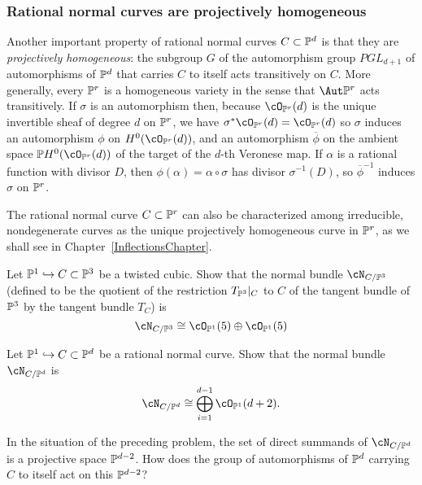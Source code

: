 \subsubsection{Rational normal curves are projectively homogeneous}

Another important property of rational normal curves $C \subset \PP^d$ is that they are \emph{projectively homogeneous}: the subgroup $G$ of the automorphism group $PGL_{d+1}$ of automorphisms of $\PP^d$ that carries $C$ to itself acts transitively on $C$. More generally,
every $\PP^r$ is a homogeneous variety in the sense that $\Aut \PP^r$ acts transitively. If $\sigma$ is an automorphism then,
 because $\cO_{\PP^r}(d)$ is the unique
invertible sheaf of degree $d$ on $\PP^r$,  we have $\sigma^*\cO_{\PP^r}(d) = \cO_{\PP^r}(d)$ so $\sigma$ induces an automorphism $\phi$ on $H^0(\cO_{\PP^r}(d))$, and an automorphism $\overline \phi$ on the ambient space $\PP H^0(\cO_{\PP^r}(d))$ of the target of the $d$-th Veronese map. If $\alpha$
is a rational function with divisor $D$, then $\phi(\alpha) = \alpha\circ \sigma$ has divisor $\sigma^{-1}(D)$, so $\overline\phi^{-1}$ induces $\sigma$ on $\PP^r$. 

The rational normal curve $C \subset \PP^r$ can also be characterized among irreducible, nondegenerate curves as the unique projectively homogeneous curve in $\PP^r$, as we shall see in Chapter~\ref{InflectionsChapter}.

\begin{exercise}
Let $\PP^1 \hookrightarrow C \subset \PP^3$ be a twisted cubic. Show that the normal bundle $\cN_{C/\PP^3}$ (defined to be the quotient of the restriction $T_{\PP^3}|_C$ to $C$ of the tangent bundle  of $\PP^3$  by the tangent bundle $T_C$) is 
$$
\cN_{C/\PP^3} \cong \cO_{\PP^1}(5) \oplus  \cO_{\PP^1}(5)
$$
\end{exercise}

\begin{exercise}
Let $\PP^1 \hookrightarrow C \subset \PP^d$ be a rational normal curve. Show that the normal bundle $\cN_{C/\PP^d}$  is 
$$
\cN_{C/\PP^d} \cong \bigoplus_{i=1}^{d-1} \cO_{\PP^1}(d+2).
$$
\end{exercise}

\begin{exercise}
In the situation of the preceding problem, the set  of direct summands of $\cN_{C/\PP^d} $ is a projective space $\PP^{d-2}$. How does the  group of automorphisms of $\PP^d$ carrying $C$ to itself act on this $\PP^{d-2}$?

\end{exercise}

